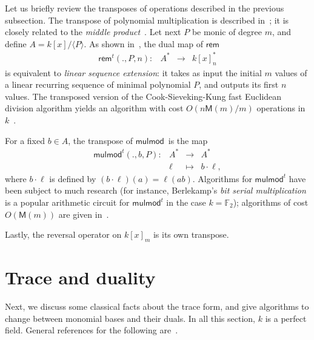 \documentclass{sig-alternate}
\def\M {\ensuremath{\mathsf{M}}}
\def\F {\ensuremath{\mathbb{F}}}
\def\rem {\ensuremath{\mathsf{rem}}}
\def\mulmod {\ensuremath{\mathsf{mulmod}}}
\newcounter{algo}
\newcommand{\ang}[1]{\langle#1\rangle}
\begin{document}
Let us briefly review the transposes of operations described in the
previous subsection. The transpose of polynomial multiplication is
described in~\cite{bostan+lecerf+schost:tellegen}; it is closely
related to the {\em middle product}~\cite{hanrot+quercia+zimmermann}.
Let next $P$ be monic of degree $m$, and define $A=k[x]/\ang{P}$. As
shown in~\cite{bostan+lecerf+schost:tellegen}, the dual map of \rem
$$
\begin{array}{cccc}
\rem^t(.,P,n): &A^\ast& \to &k[x]_n^\ast
\end{array}$$ 
is equivalent to \emph{linear sequence extension}:
it takes as input the initial $m$ values of a linear recurring
sequence of minimal polynomial $P$, and outputs its first $n$ values.
The transposed version of the Cook-Sieveking-Kung fast Euclidean
division algorithm yields an algorithm with cost $O(n\M(m)/m)$
operations in $k$~\cite{vzgathen+shoup92:journal,shoup99}.

For a fixed $b\in A$, the transpose of \mulmod\ is the map
$$
\begin{array}{cccc}
\mulmod^t(.,b,P): & A^\ast &\to& A^\ast \\
& \ell & \mapsto & b\cdot\ell,
\end{array}
$$ 
where $b \cdot \ell$ is defined by $(b \cdot \ell)(a)
=\ell(ab)$. Algorithms for $\mulmod^t$ have been subject to much
research (for instance, Berlekamp's \emph{bit serial
  multiplication}~\cite{Berlekamp82} is a popular arithmetic circuit
for $\mulmod^t$ in the case $k=\F_2$); algorithms of cost $O(\M(m))$
are given in~\cite{shoup99,bostan+lecerf+schost:tellegen}.

Lastly, the reversal operator on $k[x]_m$ is its own transpose.


\section{Trace and duality}\label{sec:trace}\label{ssec:conversions}\label{sec:trace-formulas}

Next, we discuss some classical facts about the trace form, and give
algorithms to change between monomial bases and their duals. In all
this section, $k$ is a perfect field. General references for the
following are~\cite{Kunz86,Cox-Little-OShea:UAG2005}.
\end{document}

